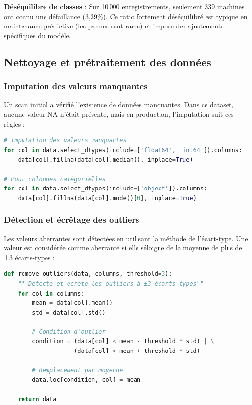 \documentclass[a4paper,12pt,twoside]{report}
\begin{document}
\textbf{Déséquilibre de classes} : Sur 10\,000 enregistrements, seulement 339 machines ont connu une défaillance (3,39\%). Ce ratio fortement déséquilibré est typique en maintenance prédictive (les pannes sont rares) et impose des ajustements spécifiques du modèle.

\subsection{Nettoyage et prétraitement des données}

\subsubsection{Imputation des valeurs manquantes}

Un scan initial a vérifié l'existence de données manquantes. Dans ce dataset, aucune valeur NA n'était présente, mais en production, l'imputation suit ces règles :

\begin{lstlisting}[language=Python]
# Imputation des valeurs manquantes
for col in data.select_dtypes(include=['float64', 'int64']).columns:
    data[col].fillna(data[col].median(), inplace=True)

# Pour colonnes catégorielles
for col in data.select_dtypes(include=['object']).columns:
    data[col].fillna(data[col].mode()[0], inplace=True)
\end{lstlisting}

\subsubsection{Détection et écrêtage des outliers}

Les valeurs aberrantes sont détectées en utilisant la méthode de l'écart-type. Une valeur est considérée comme aberrante si elle séloigne de la moyenne de plus de ±3 écarts-types :

\begin{lstlisting}[language=Python]
def remove_outliers(data, columns, threshold=3):
    """Détecte et écrête les outliers à ±3 écarts-types"""
    for col in columns:
        mean = data[col].mean()
        std = data[col].std()
        
        # Condition d'outlier
        condition = (data[col] < mean - threshold * std) | \
                    (data[col] > mean + threshold * std)
        
        # Remplacement par moyenne
        data.loc[condition, col] = mean
    
    return data
\end{lstlisting}
\end{document}

